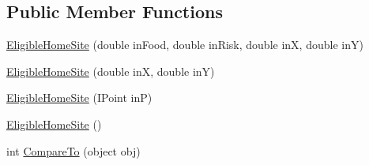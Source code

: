 \subsection*{Public Member Functions}
\begin{DoxyCompactItemize}
\item 
\hyperlink{class_s_e_a_r_c_h_1_1_eligible_home_site_a60b41b254c87550d316d60faaa22054e}{Eligible\-Home\-Site} (double in\-Food, double in\-Risk, double in\-X, double in\-Y)
\item 
\hyperlink{class_s_e_a_r_c_h_1_1_eligible_home_site_a4a518d023ef6e226eccd4fe926d5995b}{Eligible\-Home\-Site} (double in\-X, double in\-Y)
\item 
\hyperlink{class_s_e_a_r_c_h_1_1_eligible_home_site_a53815d81eab83d7c7aeb1a81e19c1b68}{Eligible\-Home\-Site} (I\-Point in\-P)
\item 
\hyperlink{class_s_e_a_r_c_h_1_1_eligible_home_site_a520d4fd53cd96dc5647f6900382bc202}{Eligible\-Home\-Site} ()
\item 
int \hyperlink{class_s_e_a_r_c_h_1_1_eligible_home_site_a0733f24b55472257d0f31b596c8fba80}{Compare\-To} (object obj)
\end{DoxyCompactItemize}
